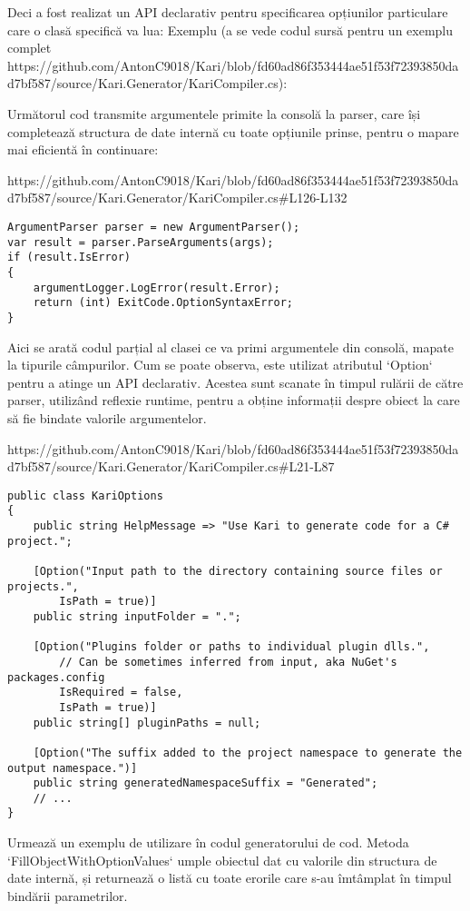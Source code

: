 \documentclass{report}
\begin{document}
Deci a fost realizat un API declarativ pentru specificarea opțiunilor particulare care o clasă specifică va lua:
Exemplu (a se vede codul sursă pentru un exemplu complet https://github.com/AntonC9018/Kari/blob/fd60ad86f353444ae51f53f72393850dad7bf587/source/Kari.Generator/KariCompiler.cs):

Următorul cod transmite argumentele primite la consolă la parser, care își completează structura de date internă cu toate opțiunile prinse, pentru o mapare mai eficientă în continuare:


https://github.com/AntonC9018/Kari/blob/fd60ad86f353444ae51f53f72393850dad7bf587/source/Kari.Generator/KariCompiler.cs#L126-L132

\begin{lstlisting}
ArgumentParser parser = new ArgumentParser();
var result = parser.ParseArguments(args);
if (result.IsError)
{
    argumentLogger.LogError(result.Error);
    return (int) ExitCode.OptionSyntaxError;
}
\end{lstlisting}

Aici se arată codul parțial al clasei ce va primi argumentele din consolă, mapate la tipurile câmpurilor.
Cum se poate observa, este utilizat atributul `Option` pentru a atinge un API declarativ.
Acestea sunt scanate în timpul rulării de către parser, utilizând reflexie runtime, pentru a obține informații despre obiect la care să fie bindate valorile argumentelor. 

https://github.com/AntonC9018/Kari/blob/fd60ad86f353444ae51f53f72393850dad7bf587/source/Kari.Generator/KariCompiler.cs#L21-L87

\begin{lstlisting}
public class KariOptions
{
    public string HelpMessage => "Use Kari to generate code for a C# project.";

    [Option("Input path to the directory containing source files or projects.", 
        IsPath = true)] 
    public string inputFolder = ".";

    [Option("Plugins folder or paths to individual plugin dlls.",
        // Can be sometimes inferred from input, aka NuGet's packages.config
        IsRequired = false,
        IsPath = true)]
    public string[] pluginPaths = null;

    [Option("The suffix added to the project namespace to generate the output namespace.")]
    public string generatedNamespaceSuffix = "Generated";
    // ...
}
\end{lstlisting}

Urmează un exemplu de utilizare în codul generatorului de cod.
Metoda `FillObjectWithOptionValues` umple obiectul dat cu valorile din structura de date internă, și returnează o listă cu toate erorile care s-au îmtâmplat în timpul bindării parametrilor. 
\end{document}
